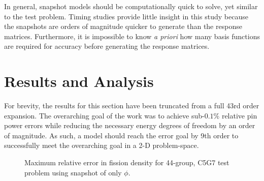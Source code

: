 \documentclass[5p,times,twocolumn,10pt]{elsarticle}
\begin{document}
In general, snapshot models should
be computationally quick to solve, yet similar to the test problem.  Timing 
studies provide little insight in this study because the snapshots are orders of 
magnitude quicker to generate than the response matrices. Furthermore, it is 
impossible to know {\it a priori} how many basis functions are required for 
accuracy before generating the response matrices.

\section{Results and Analysis}
 
For brevity, the results for this section have been 
truncated from a full 43rd order expansion.  The overarching goal of the work was to achieve 
sub-$0.1\%$ relative pin 
power errors while reducing the necessary energy degrees of freedom by an order 
of magnitude.  As such, a model should reach the error goal by 9th order to successfully meet
the overarching goal in a 2-D problem-space.

\begin{figure}[htb]
\caption{Maximum relative error in fission density for 44-group, C5G7 test problem using snapshot of only $\phi$.}
\label{fig:c5g7-flux-only}
\end{figure}
\end{document}
